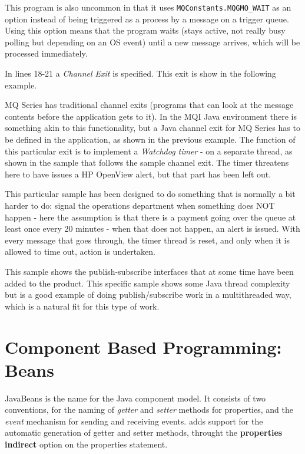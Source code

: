 This program is also uncommon in that it uses
\texttt{MQConstants.MQGMO\_WAIT} as an option instead of being
triggered as a process by a message on a trigger queue. Using this
option means that the program waits (stays active, not really busy polling
but depending on an OS event) until a new
message arrives, which will be processed immediately.

In lines 18-21 a \emph{Channel Exit} is specified. This exit is show
in the following example.

 
MQ Series has traditional channel exits (programs that can look at the
message contents before the application gets to it). In the MQI Java
environment there is something akin to this functionality, but a Java
channel exit for MQ Series has to be defined in the application, as
shown in the previous example. The function of this particular exit is
to implement a \emph{Watchdog timer} - on a separate thread, as shown
in the sample that follows the sample channel exit. The timer
threatens here to have issues a HP OpenView alert, but that part has
been left out.

This particular sample has been designed to do something that is
normally a bit harder
to do: signal the operations department when something does NOT happen
- here the assumption is that there is a payment going over the queue
at least once every 20 minutes - when that does not happen, an alert
is issued. With every message that goes through, the timer thread is
reset, and only when it is allowed to time out, action is undertaken.


This sample shows the publish-subscribe interfaces that at some time have been
added to the product. This specific sample shows some Java thread
complexity but is a good example of doing publish/subscribe work in a
multithreaded way, which is a natural fit for this type of work.



\chapter{Component Based Programming: Beans}
JavaBeans is the name for the Java component model. It consists of two
conventions, for the naming of \emph{getter} and \emph{setter} methods
for properties, and the \emph{event} mechanism for sending and
receiving events. \nr{}adds support for the automatic generation of
getter and setter methods, throught the \textbf{properties indirect}
option on the properties statement.

